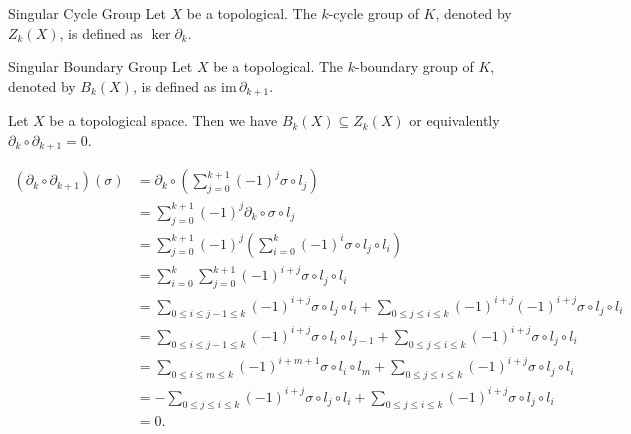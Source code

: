 \documentclass{report}
\begin{document}
\begin{definition}{Singular Cycle Group}{}
	Let $X$ be a topological. The $k$-cycle group of $K$, denoted by $Z_k(X)$,  is defined as $\ker\partial_k$.
\end{definition}


\begin{definition}{Singular Boundary Group}{}
	Let $X$ be a topological. The $k$-boundary group of $K$, denoted by $B_k(X)$, is defined as $\mathrm{im}\,\partial_{k+1}$.
\end{definition}


\begin{proposition}{}{}
	Let $X$ be a topological space. Then we have $B_k(X)\subseteq Z_k(X)$ or equivalently $\partial_k\circ\partial_{k+1}=0$.
\end{proposition}

\begin{prf}
	\[
	\begin{aligned}
		\left(\partial_k\circ\partial_{k+1}\right)(\sigma)&=\partial_{k}\circ\left(\sum_{j=0}^{k+1}(-1)^{j}\sigma\circ l_j\right)\\
		&=\sum_{j=0}^{k+1}(-1)^{j}\partial_{k}\circ\sigma\circ l_j\\
		&=\sum_{j=0}^{k+1}(-1)^{j}\left(\sum_{i=0}^k(-1)^{i}\sigma\circ l_j\circ l_i\right)\\
		&=\sum_{i=0}^{k}\sum_{j=0}^{k+1}(-1)^{i+j}\sigma\circ l_j\circ l_i\\
		&=\sum_{0\le i\le j-1\le k}(-1)^{i+j}\sigma\circ l_j\circ l_i+\sum_{0\le j\le i\le k}(-1)^{i+j}(-1)^{i+j}\sigma\circ l_j\circ l_i\\
		&=\sum_{0\le i\le j-1\le k}(-1)^{i+j}\sigma\circ l_i\circ l_{j-1}+\sum_{0\le j\le i\le k}(-1)^{i+j}\sigma\circ l_j\circ l_i\\
		&=\sum_{0\le i\le m\le k}(-1)^{i+m+1}\sigma\circ l_i\circ l_{m}+\sum_{0\le j\le i\le k}(-1)^{i+j}\sigma\circ l_j\circ l_i\\
		&=-\sum_{0\le j\le i\le k}(-1)^{i+j}\sigma\circ l_j\circ l_{i}+\sum_{0\le j\le i\le k}(-1)^{i+j}\sigma\circ l_j\circ l_i\\
		&=0.
	\end{aligned}
	\]
\end{prf}
\end{document}
